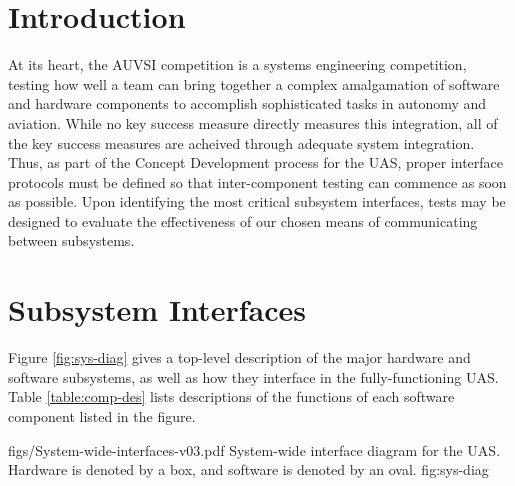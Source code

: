 \documentclass[]{auvsi_doc}
\begin{document}
\begin{AUVSITitlePage}
\begin{artifacttable}
\end{artifacttable}
\end{AUVSITitlePage}

\section{Introduction}

At its heart, the AUVSI competition is a systems engineering competition, testing how well a team can bring together a complex amalgamation of software and hardware components to accomplish sophisticated tasks in autonomy and aviation.
While no key success measure directly measures this integration, all of the key success measures are acheived through adequate system integration. 
Thus, as part of the Concept Development process for the UAS, proper interface protocols must be defined so that inter-component testing can commence as soon as possible. Upon identifying the most critical subsystem interfaces, tests may be designed to evaluate the effectiveness of our chosen means of communicating between subsystems.

\section{Subsystem Interfaces}
Figure \ref{fig:sys-diag} gives a top-level description of the major hardware and software subsystems, as well as how they interface in the fully-functioning UAS. Table \ref{table:comp-des} lists descriptions of the functions of each software component listed in the figure.

\vspace{0.3cm}

\AUVSIFigure
{{figs/System-wide-interfaces-v03.pdf}}
{\textwidth}
{System-wide interface diagram for the UAS. Hardware is denoted by a box, and software is denoted by an oval.}
{fig:sys-diag}
\end{document}
